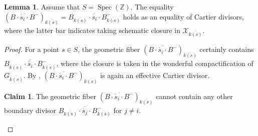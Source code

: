 \documentclass[11pt, reqno]{amsart}
\theoremstyle{plain}
\theoremstyle{definition}
\newtheorem{lemma}[theorem]{Lemma}
\newtheorem{claim}[theorem]{Claim}
\DeclareMathOperator{\Spec}{Spec}		%
\begin{document}
\begin{lemma}\label{fiberbasechangelemma}
    Assume that $S=\Spec(\mathbb{Z})$. The equality $ (\overline{B\cdot \dot{s_i} \cdot B^-})_{\overline{k(s)}}=\overline{B_{\overline{k(s)}}\cdot \dot{s_i} \cdot B_{\overline{k(s)}}^-}$ holds as an equality of Cartier divisors, where the latter bar indicates taking schematic closure in $\mathcal{X}_{\overline{k(s)}}$.
\end{lemma}


\begin{proof}

For a point $s\in S$, the geometric fiber $(\overline{B\cdot \dot{s_i} \cdot B^-})_{\overline{k(s)}}$ certainly contains $\overline{B_{\overline{k(s)}}\cdot \dot{s_i} \cdot B_{\overline{k(s)}}^-}$, where the closure is taken in the wonderful compactification of $G_{\overline{k(s)}}$. By \cite[056Q]{stacks-project}, $(\overline{B\cdot \dot{s_i} \cdot B^-})_{\overline{k(s)}}$ is again an effective Cartier divisor.

\begin{claim}\label{claimdivisor}
    The geometric fiber $(\overline{B\cdot \dot{s_i} \cdot B^-})_{\overline{k(s)}}$ cannot contain any other boundary divisor $\overline{B_{\overline{k(s)}}\cdot \dot{s_j} \cdot B_{\overline{k(s)}}^-}$ for $j\neq i$.
\end{claim}


\end{proof}
\end{document}
